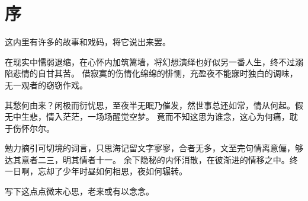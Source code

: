 \part{序}

\vspace*{2\ccwd}

\hspace*{2em} 这内里有许多的故事和戏码，将它说出来罢。

\vspace*{\ccwd}

\hspace*{2em} 在现实中懦弱退缩，在心怀内加筑篱墙，将幻想演绎也好似另一番人生，终不过溺陷悲情的自甘其苦。
借寂寞的伤情化绵绵的悱恻，充盈夜不能寐时独白的调味，无一观者的窃窃作戏。

\vspace*{\ccwd}

\hspace*{2em} 其愁何由来？闲极而衍忧思，至夜半无眠乃催发，然世事总还如常，情从何起。假无中生悲，情入茫茫，一场场醒觉空梦。
竟而不知这思为谁念，这心为何痛，耽于伤怀尔尔。

\vspace*{\ccwd}

\hspace*{2em} 勉力摘引可切境的词言，只思海记留文字寥寥，合者无多，文至完句情离意偏，够达其意者二三，明其情者十一。
余下隐秘的内怀消散，在彼渐进的情移之中。终一日啊，忘却了少年时昼如何相思，夜如何辗转。

\vspace*{\ccwd}

\hspace*{2em} 写下这点点微末心思，老来或有以念念。

\newpage